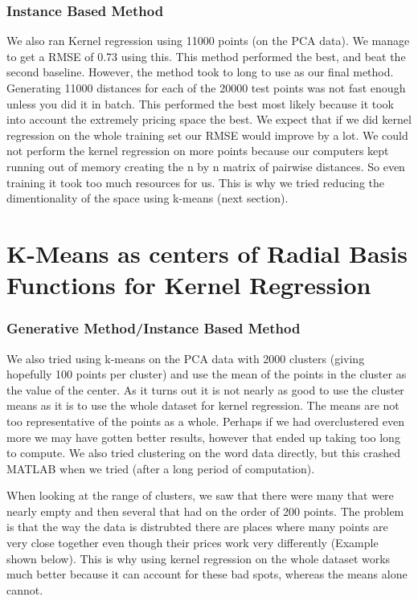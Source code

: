 \documentclass[a4paper,10pt]{article}
\begin{document}
\subsubsection*{Instance Based Method}
We also ran Kernel regression using 11000 points (on the PCA data). We manage to get a RMSE of 0.73 using this. This method performed the best, and beat the second baseline. However, the method took to long to use as our final method. Generating 11000 distances for each of the 20000 test points was not fast enough unless you did it in batch. This performed the best most likely because it took into account the extremely pricing space the best. We expect that if we did kernel regression on the whole training set our RMSE would improve by a lot. We could not perform the kernel regression on more points because our computers kept running out of memory creating the n by n matrix of pairwise distances. So even training it took too much resources for us. This is why we tried reducing the dimentionality of the space using k-means (next section).

\section{K-Means as centers of Radial Basis Functions for Kernel Regression}
\subsubsection*{Generative Method/Instance Based Method}
We also tried using k-means on the PCA data with 2000 clusters (giving hopefully 100 points per cluster) and use the mean of the points in the cluster as the value of the center. As it turns out it is not nearly as good to use the cluster means as it is to use the whole dataset for kernel regression. The means are not too representative of the points as a whole. Perhaps if we had overclustered even more we may have gotten better results, however that ended up taking too long to compute. We also tried clustering on the word data directly, but this crashed MATLAB when we tried (after a long period of computation).

When looking at the range of clusters, we saw that there were many that were nearly empty and then several that had on the order of 200 points. The problem is that the way the data is distrubted there are places where many points are very close together even though their prices work very differently (Example shown below). This is why using kernel regression on the whole dataset works much better because it can account for these bad spots, whereas the means alone cannot.
\end{document}
